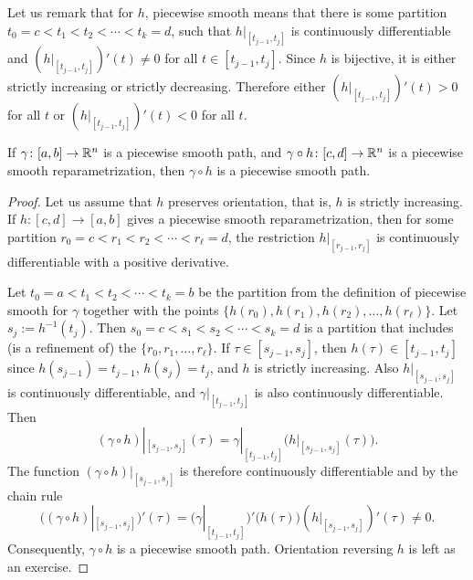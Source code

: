 Let us remark that for $h$, piecewise smooth means that there is
some partition $t_0 = c < t_1 < t_2 < \cdots < t_k = d$,
such that $h|_{[t_{j-1},t_j]}$ is continuously differentiable
and $(h|_{[t_{j-1},t_j]})'(t) \not= 0$ for all $t \in [t_{j-1},t_j]$.
Since $h$ is bijective, it is either strictly increasing or
strictly decreasing.  Therefore either $(h|_{[t_{j-1},t_j]})'(t) > 0$
for all $t$ or $(h|_{[t_{j-1},t_j]})'(t) < 0$ for all $t$.

\begin{prop} \label{prop:reparamapiecewisesmooth}
If $\gamma \colon [a,b] \to {\mathbb{R}}^n$ is a piecewise smooth path,
and $\gamma \circ h \colon [c,d] \to {\mathbb{R}}^n$ is
a piecewise smooth reparametrization, then $\gamma \circ h$
is a piecewise smooth path.
\end{prop}

\begin{proof}
Let us assume that $h$ preserves orientation, that is, $h$ is strictly
increasing.
If $h \colon [c,d] \to [a,b]$ gives a piecewise smooth reparametrization,
then for some partition
$r_0 = c < r_1 < r_2 < \cdots < r_\ell = d$, the restriction
$h|_{[r_{j-1},r_j]}$ is continuously differentiable with a positive
derivative.

Let $t_0 = a < t_1 < t_2 < \cdots < t_k = b$ be the partition from the
definition of piecewise smooth for $\gamma$ together with the 
points $\{ h(r_0), h(r_1), h(r_2), \ldots, h(r_\ell) \}$.
Let $s_j := h^{-1}(t_j)$.  Then
$s_0 = c < s_1 < s_2 < \cdots < s_k = d$
is a partition that includes (is a refinement of) the
$\{ r_0,r_1,\ldots,r_\ell \}$.
If $\tau \in [s_{j-1},s_j]$, then $h(\tau) \in [t_{j-1},t_j]$
since $h(s_{j-1}) = t_{j-1}$,
$h(s_{j}) = t_j$, and
$h$ is strictly increasing.
Also $h|_{[s_{j-1},s_j]}$ is continuously differentiable, and
$\gamma|_{[t_{j-1},t_j]}$ is also continuously differentiable.
Then
\begin{equation*}
(\gamma \circ h)|_{[s_{j-1},s_{j}]} (\tau)
=
\gamma|_{[t_{j-1},t_{j}]} \bigl( h|_{[s_{j-1},s_j]}(\tau) \bigr) .
\end{equation*}
The function 
$(\gamma \circ h)|_{[s_{j-1},s_{j}]}$ is therefore continuously
differentiable and
by the chain rule
\begin{equation*}
\bigl( (\gamma \circ h)|_{[s_{j-1},s_{j}]} \bigr) ' (\tau)
=
\bigl( \gamma|_{[t_{j-1},t_{j}]} \bigr)' \bigl( h(\tau) \bigr)
(h|_{[s_{j-1},s_j]})'(\tau) \not= 0 .
\end{equation*}
Consequently, $\gamma \circ h$ is a piecewise smooth path.
Orientation reversing $h$ is left as an exercise.
\end{proof}

